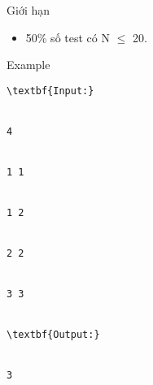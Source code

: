 Giới hạn
\begin{itemize}
	\item     50\% số test có N  $\le$  20.   
\end{itemize}
Example
\begin{verbatim}
\textbf{Input:}


4


1 1


1 2


2 2


3 3


\textbf{Output:}


3\end{verbatim}
